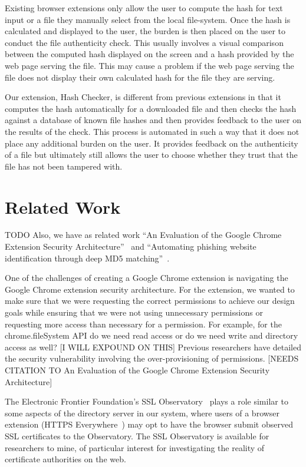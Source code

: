 \documentclass[letterpaper,twocolumn,10pt]{article}
\begin{document}
Existing browser extensions only allow the user to compute the hash for text input or a file they manually select from the local file-system. Once the hash is calculated and displayed to the user, the burden is then placed on the user to conduct the file authenticity check. This usually involves a visual comparison between the computed hash displayed on the screen and a hash provided by the web page serving the file. This may cause a problem if the web page serving the file does not display their own calculated hash for the file they are serving.

Our extension, Hash Checker, is different from previous extensions in that it computes the hash automatically for a downloaded file and then checks the hash against a database of known file hashes and then provides feedback to the user on the results of the check. This process is automated in such a way that it does not place any additional burden on the user. It provides feedback on the authenticity of a file but ultimately still allows the user to choose whether they trust that the file has not been tampered with.

\section{Related Work}

TODO Also, we have as related work ``An Evaluation of the Google Chrome Extension Security Architecture''~\cite{180206} and ``Automating phishing website identification through deep MD5 matching''~\cite{Wardman}.

One of the challenges of creating a Google Chrome extension is navigating the Google Chrome extension security architecture. For the extension, we wanted to make sure that we were requesting the correct permissions to achieve our design goals while ensuring that we were not using unnecessary permissions or requesting more access than necessary for a permission. For example, for the chrome.fileSystem API do we need read access or do we need write and directory access as well? [I WILL EXPOUND ON THIS] Previous researchers have detailed the security vulnerability involving the over-provisioning of permissions. [NEEDS CITATION TO An Evaluation of the Google Chrome Extension Security Architecture]

The Electronic Frontier Foundation's SSL Observatory~\cite{ssl-observatory} plays a role
similar to some aspects of the directory server in our system, where users of a browser
extension (HTTPS Everywhere~\cite{https-everywhere}) may opt to have the browser
submit observed SSL certificates to the Observatory. The SSL Observatory is available for
researchers to mine, of particular interest for investigating the reality of certificate authorities
on the web.
\end{document}
